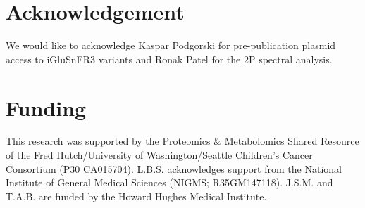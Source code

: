 \documentclass[9pt,lineno]{elife}
\begin{document}
\section{Acknowledgement}
We would like to acknowledge Kaspar Podgorski for pre-publication plasmid access to iGluSnFR3 variants and Ronak Patel for the 2P spectral analysis.

\section{Funding}
This research was supported by the Proteomics \& Metabolomics Shared Resource of the Fred Hutch/University of Washington/Seattle Children’s Cancer Consortium (P30 CA015704).
L.B.S. acknowledges support from the National Institute of General Medical Sciences (NIGMS; R35GM147118).
J.S.M. and T.A.B. are funded by the Howard Hughes Medical Institute.




\end{document}
